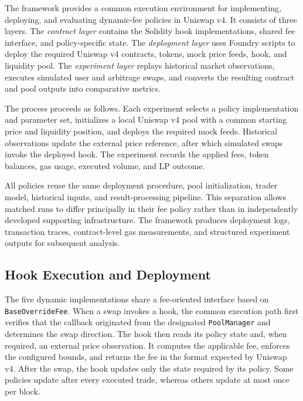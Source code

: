\documentclass[a4paper,conference]{IEEEtran}
\begin{document}
The framework provides a common execution environment for implementing,
deploying, and evaluating dynamic-fee policies in Uniswap v4. It
consists of three layers. The \emph{contract layer} contains the
Solidity hook implementations, shared fee interface, and
policy-specific state. The \emph{deployment layer} uses Foundry scripts
to deploy the required Uniswap v4 contracts, tokens, mock price feeds,
hook, and liquidity pool. The \emph{experiment layer} replays
historical market observations, executes simulated user and arbitrage
swaps, and converts the resulting contract and pool outputs into
comparative metrics.

The process proceeds as follows. Each experiment
selects a policy implementation and parameter set, initializes a local
Uniswap v4 pool with a common starting price and liquidity position,
and deploys the required mock feeds. Historical observations update
the external price reference, after which simulated swaps invoke the
deployed hook. The experiment records the applied fees, token
balances, gas usage, executed volume, and LP outcome.


All policies reuse the same deployment procedure, pool initialization,
trader model, historical inputs, and result-processing pipeline. This
separation allows matched runs to differ principally in their fee
policy rather than in independently developed supporting
infrastructure. The framework produces deployment logs, transaction
traces, contract-level gas measurements, and structured experiment
outputs for subsequent analysis.

\subsection{Hook Execution and Deployment}

The five dynamic implementations share a fee-oriented interface based
on \texttt{BaseOverrideFee}. When a swap invokes a hook, the common
execution path first verifies that the callback originated from the
designated \texttt{PoolManager} and determines the swap direction. The
hook then reads its policy state and, when required, an external price
observation. It computes the applicable fee, enforces the configured
bounds, and returns the fee in the format expected by Uniswap v4.
After the swap, the hook updates only the state required by its policy.
Some policies update after every executed trade, whereas others update
at most once per block.
\end{document}
